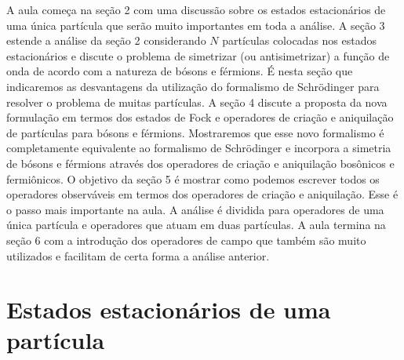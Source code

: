 \documentclass{article}
\begin{document}
A aula começa na seção 2 com uma discussão sobre os estados estacionários de uma única partícula que serão muito importantes em toda a análise. A seção 3 estende a análise da seção 2 considerando $N$ partículas colocadas nos estados estacionários e discute o problema de simetrizar (ou antisimetrizar) a função de onda de acordo com a natureza de bósons e férmions. É nesta seção que indicaremos as desvantagens da utilização do formalismo de Schrödinger para resolver o problema de muitas partículas. A seção 4 discute a proposta da nova formulação em termos dos estados de Fock e operadores de criação e aniquilação de partículas para bósons e férmions. Mostraremos que esse novo formalismo é completamente equivalente ao formalismo de Schrödinger e incorpora a simetria de bósons e férmions através dos operadores de criação e aniquilação bosônicos e fermiônicos. O objetivo da seção 5 é mostrar como podemos escrever todos os operadores observáveis em termos dos operadores de criação e aniquilação. Esse é o passo mais importante na aula. A análise é dividida para operadores de uma única partícula e operadores que atuam em duas partículas. A aula termina na seção 6 com a introdução dos operadores de campo que também são muito utilizados e facilitam de certa forma a análise anterior.




\section{Estados estacionários de uma partícula}
\end{document}
